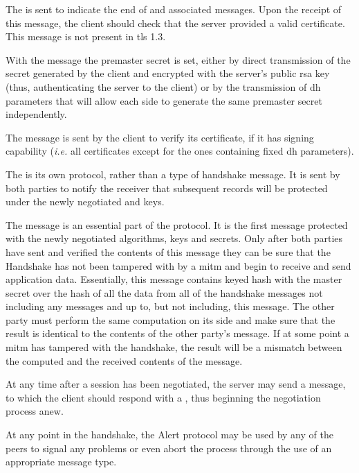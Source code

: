 \documentclass{llncs}
\begin{document}
The  is sent to indicate the end of 
and associated messages. Upon the receipt of this message, the client should check
that the server provided a valid certificate. This message is not present in \gls{tls} 1.3.

With the  message the premaster secret is
set, either by direct transmission of the secret generated by the client
and encrypted with the server's public \gls{rsa} key (thus, authenticating the server to the client)
or by the transmission of \gls{dh} parameters that will allow each side to generate
the same premaster secret independently.

The  message is sent by the client to verify its
certificate, if it has signing capability (\textit{i.e.} all certificates except for the ones
containing fixed \gls{dh} parameters).

The  is its own protocol, rather than a type of handshake
message. It is sent by both parties to notify the receiver that subsequent records
will be protected under the newly negotiated  and keys.

The  message is an essential part of the protocol. It is the first
message protected with the newly negotiated algorithms, keys and secrets. Only after
both parties have sent and verified the contents of this message they can
be sure that the Handshake has not been tampered with by a \gls{mitm} and begin to
receive and send application data. Essentially, this message contains keyed hash
with the master secret over the hash of all the data from all of the
handshake messages not including any  messages and up to, but
not including, this message. The other party must perform the same computation on its
side and make sure that the result is identical to the contents of the other party's
 message. If at some point a \gls{mitm} has tampered with the
handshake, the result will be a mismatch between the computed and the received contents of the
 message.

At any time after a session has been negotiated, the server may send a 
message, to which the client should respond with a , thus
beginning the negotiation process anew.

At any point in the handshake, the Alert protocol may be used by any of the peers
to signal any problems or even abort the process through the use of an appropriate message type.
\end{document}
